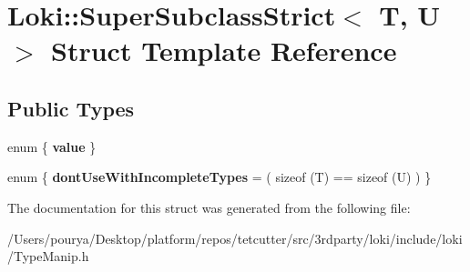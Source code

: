 \hypertarget{structLoki_1_1SuperSubclassStrict}{}\section{Loki\+:\+:Super\+Subclass\+Strict$<$ T, U $>$ Struct Template Reference}
\label{structLoki_1_1SuperSubclassStrict}
\subsection*{Public Types}
\begin{DoxyCompactItemize}
\item 
\hypertarget{structLoki_1_1SuperSubclassStrict_a9cb76842b150e4ee5e3cb9d7f5b95af6}{}enum \{ {\bfseries value}
 \}\label{structLoki_1_1SuperSubclassStrict_a9cb76842b150e4ee5e3cb9d7f5b95af6}

\item 
\hypertarget{structLoki_1_1SuperSubclassStrict_ac3ed5b106ff08c131c8780ccec60e756}{}enum \{ {\bfseries dont\+Use\+With\+Incomplete\+Types} = ( sizeof (T) == sizeof (U) )
 \}\label{structLoki_1_1SuperSubclassStrict_ac3ed5b106ff08c131c8780ccec60e756}

\end{DoxyCompactItemize}


The documentation for this struct was generated from the following file\+:\begin{DoxyCompactItemize}
\item 
/\+Users/pourya/\+Desktop/platform/repos/tetcutter/src/3rdparty/loki/include/loki/Type\+Manip.\+h\end{DoxyCompactItemize}
